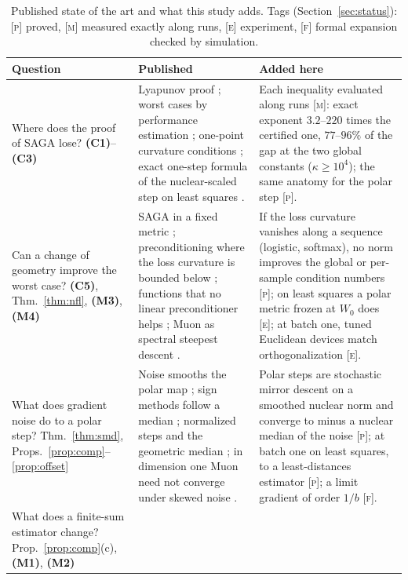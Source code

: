 \documentclass[10pt]{article}
\theoremstyle{remark}
\newcommand{\finding}[1]{\textbf{(#1)}}
\newcommand{\nat}[1]{\textsc{[#1]}}
\begin{document}
\begin{table}[t]
\caption{Published state of the art and what this study adds. Tags (Section~\ref{sec:status}): \nat{p} proved, \nat{m}
measured exactly along runs, \nat{e} experiment, \nat{f} formal expansion checked by simulation.}\label{tab:sota}
\centering\footnotesize
\renewcommand{\arraystretch}{1.05}
\begin{tabularx}{\textwidth}{@{}>{\raggedright\arraybackslash}p{}YY@{}}
\toprule
Question & Published & Added here \\
\midrule
Where does the proof of SAGA lose? \finding{C1}--\finding{C3} &
Lyapunov proof \cite{defazio2014saga,bach2024learning}; worst cases by performance estimation
\cite{taylor2017smooth,hu2017unified}; one-point curvature conditions \cite{zhang2013gradient}; exact one-step formula
of the nuclear-scaled step on least squares \cite{shulgin2026quadratic,jawanpuria2026constant}. &
Each inequality evaluated along runs \nat{m}: exact exponent $3.2$--$220$ times the certified one, $77$--$96\%$ of the
gap at the two global constants ($\kappa\ge10^4$); the same anatomy for the polar step \nat{p}. \\
Can a change of geometry improve the worst case? \finding{C5}, Thm.~\ref{thm:nfl}, \finding{M3}, \finding{M4} &
SAGA in a fixed metric \cite{dragomir2021fast}; preconditioning where the loss curvature is
bounded below \cite{yang2014data,gonen2016solving}; functions that no linear preconditioner helps
\cite{hird2025quantifying}; Muon as spectral steepest descent \cite{bernstein2024old}. &
If the loss curvature vanishes along a sequence (logistic, softmax), no norm improves the global or per-sample condition
numbers \nat{p}; on least squares a polar metric frozen at $W_0$ does \nat{e}; at batch one, tuned Euclidean devices
match orthogonalization \nat{e}. \\
What does gradient noise do to a polar step? Thm.~\ref{thm:smd}, Props.~\ref{prop:comp}--\ref{prop:offset} &
Noise smooths the polar map \cite{xie2026muon,chen2026when}; sign methods follow a median
\cite{chen2020distributed,bernstein2019majority}; normalized steps and the geometric median
\cite{cardot2013efficient}; in dimension one Muon need not converge under skewed noise
\cite{do2026muon}. &
Polar steps are stochastic mirror descent on a smoothed nuclear norm and converge to minus a nuclear median of the
noise \nat{p}; at batch one on least squares, to a least-distances estimator \nat{p}; a limit gradient of order $1/b$
\nat{f}. \\
What does a finite-sum estimator change? Prop.~\ref{prop:comp}(c), \finding{M1}, \finding{M2} &

\end{tabularx}
\end{table}
\end{document}
